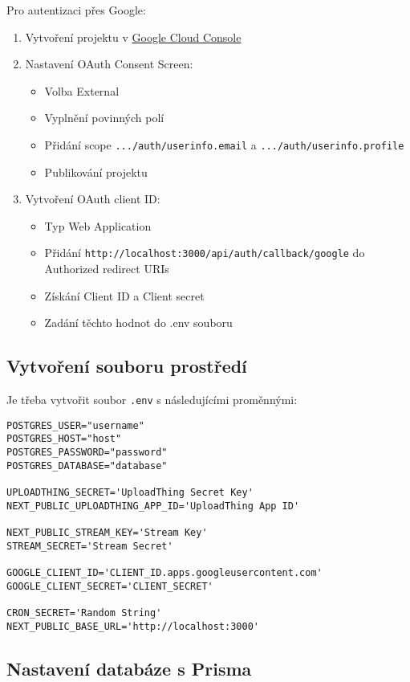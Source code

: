 \documentclass[12pt]{article}
\begin{document}
Pro autentizaci přes Google:
\begin{enumerate}
  \item Vytvoření projektu v \href{https://console.cloud.google.com/}{Google Cloud Console}
  \item Nastavení OAuth Consent Screen:
    \begin{itemize}
      \item Volba External
      \item Vyplnění povinných polí
      \item Přidání scope \texttt{.../auth/userinfo.email} a \texttt{.../auth/userinfo.profile}
      \item Publikování projektu
    \end{itemize}
  \item Vytvoření OAuth client ID:
    \begin{itemize}
      \item Typ Web Application
      \item Přidání \texttt{http://localhost:3000/api/auth/callback/google} do Authorized redirect URIs
      \item Získání Client ID a Client secret
      \item Zadání těchto hodnot do .env souboru
    \end{itemize}
\end{enumerate}

\subsection{Vytvoření souboru prostředí}

Je třeba vytvořit soubor \texttt{.env} s následujícími proměnnými:

\begin{verbatim}
POSTGRES_USER="username"
POSTGRES_HOST="host"
POSTGRES_PASSWORD="password"
POSTGRES_DATABASE="database"

UPLOADTHING_SECRET='UploadThing Secret Key'
NEXT_PUBLIC_UPLOADTHING_APP_ID='UploadThing App ID'

NEXT_PUBLIC_STREAM_KEY='Stream Key'
STREAM_SECRET='Stream Secret'

GOOGLE_CLIENT_ID='CLIENT_ID.apps.googleusercontent.com'
GOOGLE_CLIENT_SECRET='CLIENT_SECRET'

CRON_SECRET='Random String'
NEXT_PUBLIC_BASE_URL='http://localhost:3000'
\end{verbatim}

\subsection{Nastavení databáze s Prisma}
\end{document}
